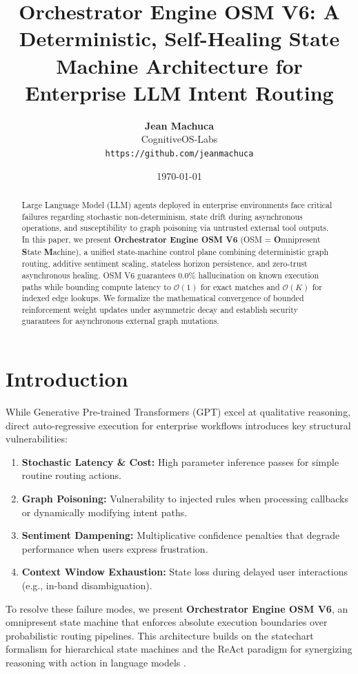 \documentclass[10pt,twocolumn]{article}
\title{\textbf{Orchestrator Engine OSM V6: A Deterministic, Self-Healing State Machine Architecture for Enterprise LLM Intent Routing}}
\author{
  \textbf{Jean Machuca}\\
  \small CognitiveOS-Labs\\
  \small \texttt{https://github.com/jeanmachuca}
}
\date{\today}
\begin{document}
\maketitle

\begin{abstract}
Large Language Model (LLM) agents deployed in enterprise environments face critical failures regarding stochastic non-determinism, state drift during asynchronous operations, and susceptibility to graph poisoning via untrusted external tool outputs. In this paper, we present \textbf{Orchestrator Engine OSM V6} (OSM = \textbf{O}mnipresent \textbf{S}tate \textbf{M}achine), a unified state-machine control plane combining deterministic graph routing, additive sentiment scaling, stateless horizon persistence, and zero-trust asynchronous healing. OSM V6 guarantees $0.0\%$ hallucination on known execution paths while bounding compute latency to $\mathcal{O}(1)$ for exact matches and $\mathcal{O}(K)$ for indexed edge lookups. We formalize the mathematical convergence of bounded reinforcement weight updates under asymmetric decay and establish security guarantees for asynchronous external graph mutations.
\end{abstract}

\section{Introduction}
While Generative Pre-trained Transformers (GPT) excel at qualitative reasoning, direct auto-regressive execution for enterprise workflows introduces key structural vulnerabilities:
\begin{enumerate}
    \item \textbf{Stochastic Latency \& Cost:} High parameter inference passes for simple routine routing actions.
    \item \textbf{Graph Poisoning:} Vulnerability to injected rules when processing callbacks or dynamically modifying intent paths.
    \item \textbf{Sentiment Dampening:} Multiplicative confidence penalties that degrade performance when users express frustration.
    \item \textbf{Context Window Exhaustion:} State loss during delayed user interactions (e.g., in-band disambiguation).
\end{enumerate}

To resolve these failure modes, we present \textbf{Orchestrator Engine OSM V6}, an omnipresent state machine that enforces absolute execution boundaries over probabilistic routing pipelines. This architecture builds on the statechart formalism for hierarchical state machines \cite{state_machines} and the ReAct paradigm for synergizing reasoning with action in language models \cite{llm_agents}.
\end{document}
